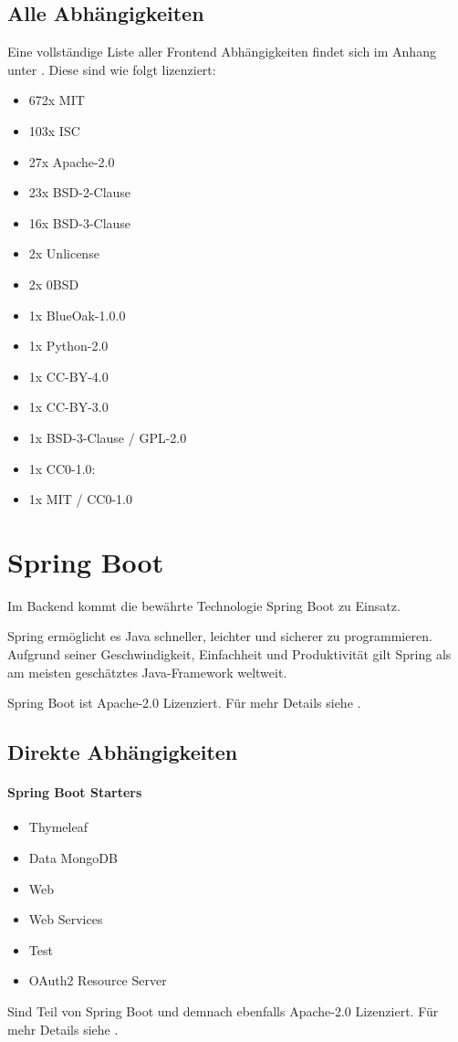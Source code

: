 \subsection{Alle Abhängigkeiten}
Eine vollständige Liste aller Frontend Abhängigkeiten findet sich im Anhang unter .
Diese sind wie folgt lizenziert:
\begin{itemize}
    \item 672x MIT
    \item 103x ISC
    \item 27x Apache-2.0
    \item 23x BSD-2-Clause
    \item 16x BSD-3-Clause
    \item 2x Unlicense
    \item 2x 0BSD
    \item 1x BlueOak-1.0.0
    \item 1x Python-2.0
    \item 1x CC-BY-4.0
    \item 1x CC-BY-3.0
    \item 1x BSD-3-Clause / GPL-2.0
    \item 1x CC0-1.0:
    \item 1x MIT / CC0-1.0
\end{itemize}



\section{Spring Boot}\label{sec:spring-boot}

Im Backend kommt die bewährte Technologie Spring Boot zu Einsatz.

Spring ermöglicht es Java schneller, leichter und sicherer zu programmieren.
Aufgrund seiner Geschwindigkeit, Einfachheit und Produktivität gilt Spring als am meisten geschätztes Java-Framework weltweit.
\cite{about-springboot}

Spring Boot ist Apache-2.0 Lizenziert.
Für mehr Details siehe .

\subsection{Direkte Abhängigkeiten}\label{subsec:direkte-abhanigkeiten}

\paragraph{Spring Boot Starters}
\begin{itemize}
    \item Thymeleaf
    \item Data MongoDB
    \item Web
    \item Web Services
    \item Test
    \item OAuth2 Resource Server
\end{itemize}
Sind Teil von Spring Boot und demnach ebenfalls Apache-2.0 Lizenziert.
Für mehr Details siehe .

